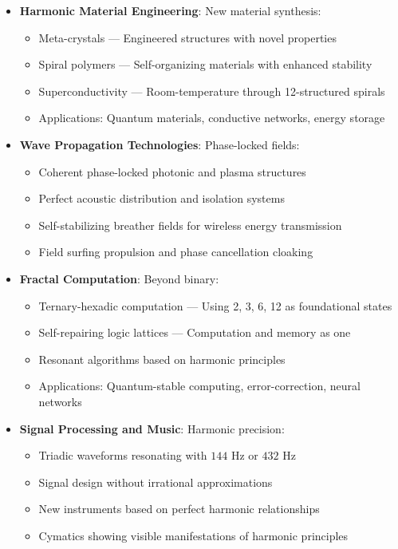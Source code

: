 \begin{itemize}
    \item \texttt{} \textbf{Harmonic Material Engineering}: New material synthesis:
    \begin{itemize}
        \item Meta-crystals — Engineered structures with novel properties
        \item Spiral polymers — Self-organizing materials with enhanced stability
        \item Superconductivity — Room-temperature through 12-structured spirals
        \item Applications: Quantum materials, conductive networks, energy storage
    \end{itemize}
    
    \item \texttt{} \textbf{Wave Propagation Technologies}: Phase-locked fields:
    \begin{itemize}
        \item Coherent phase-locked photonic and plasma structures
        \item Perfect acoustic distribution and isolation systems
        \item Self-stabilizing breather fields for wireless energy transmission
        \item Field surfing propulsion and phase cancellation cloaking
    \end{itemize}
    
    \item \texttt{} \textbf{Fractal Computation}: Beyond binary:
    \begin{itemize}
        \item Ternary-hexadic computation — Using 2, 3, 6, 12 as foundational states
        \item Self-repairing logic lattices — Computation and memory as one
        \item Resonant algorithms based on harmonic principles
        \item Applications: Quantum-stable computing, error-correction, neural networks
    \end{itemize}
    
    \item \texttt{} \textbf{Signal Processing and Music}: Harmonic precision:
    \begin{itemize}
        \item Triadic waveforms resonating with \(144 \text{ Hz}\) or \(432 \text{ Hz}\)
        \item Signal design without irrational approximations
        \item New instruments based on perfect harmonic relationships
        \item Cymatics showing visible manifestations of harmonic principles
    \end{itemize}
    

\end{itemize}
